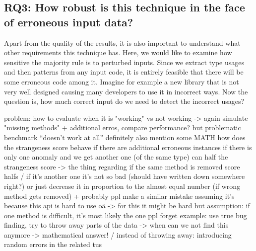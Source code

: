 
\subsection{RQ3: How robust is this technique in the face of erroneous input data?}


Apart from the quality of the results, it is also important to understand what other requirements this technique has.
Here, we would like to examine how sensitive the majority rule is to perturbed inputs.
Since we extract type usages and then patterns from any input code, it is entirely feasible that there will be some erroneous code among it.
Imagine for example a new library that is not very well designed causing many developers to use it in incorrect ways.
Now the question is, how much correct input do we need to detect the incorrect usages?

problem: how to evaluate when it is "working" vs not working
    -> again simulate "missing methods" + additional erros, compare performance?
    but problematic benchmark ``doesn't work at all''
definitely also mention some MATH
    how does the strangeness score behave if there are additional erroneous instances
    if there is only one anomaly and we get another one (of the same type) can half the strangeness score
    -> the thing regarding if the same method is removed score halfs / if it's another one it's not so bad (should have written down somewhere right?)
    or just decrease it in proportion to the almost equal number (if wrong method gets removed)
    + probably ppl make a similar mistake assuming it's because this api is hard to use oä -> for this it might be hard
    but assumption: if one method is difficult, it's most likely the one ppl forget
example: use true bug finding, try to throw away parts of the data -> when can we not find this anymore -> mathematical answer!
/ instead of throwing away: introducing random errors in the related tus


